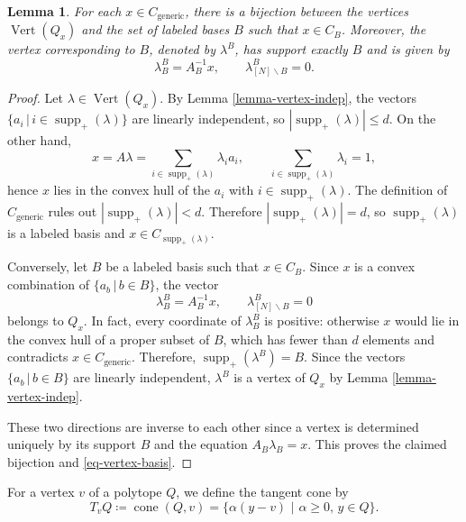 \documentclass[12pt]{amsart}
\newtheorem{lemma}[theorem]{Lemma}
\numberwithin{equation}{section}
\numberwithin{theorem}{section}
\newcommand{\op}{\operatorname}
\begin{document}
\begin{lemma}
  \label{lemma-vertex-basis}
  For each $x\in C_{\mathrm{generic}}$, there is a bijection between the vertices $\op{Vert}(Q_x)$ and the set of labeled bases $B$ such that $x\in C_B$. Moreover, the vertex corresponding to $B$, denoted by $\lambda^B$, has support exactly $B$ and is given by
  \begin{equation}
  \label{eq-vertex-basis}
    \lambda^B_B=A^{-1}_Bx,\qquad \lambda^B_{[N]\backslash B}=0.
  \end{equation}
\end{lemma}
\begin{proof}
  Let $\lambda\in\op{Vert}(Q_x)$. By Lemma \ref{lemma-vertex-indep}, the vectors $\{a_i\,|\,i\in \op{supp}_+(\lambda)\}$ are linearly independent, so $|\op{supp}_+(\lambda)|\leq d$. On the other hand,
  \begin{equation*}
    x=A\lambda=\sum_{i\in \op{supp}_+(\lambda)}\lambda_i a_i,
    \qquad \sum_{i\in \op{supp}_+(\lambda)}\lambda_i=1,
  \end{equation*}
  hence $x$ lies in the convex hull of the $a_i$ with $i\in\op{supp}_+(\lambda)$. The definition of $C_{\mathrm{generic}}$ rules out $|\op{supp}_+(\lambda)|<d$. Therefore $|\op{supp}_+(\lambda)|=d$, so $\op{supp}_+(\lambda)$ is a labeled
  basis and $x\in C_{\op{supp}_+(\lambda)}$.

  Conversely, let $B$ be a labeled basis such that $x\in C_B$. Since $x$ is a convex combination of $\{a_b\,|\,b\in B\}$, the vector
  \begin{equation*}
    \lambda^B_B=A_B^{-1}x,\qquad
    \lambda^B_{[N]\backslash B}=0
  \end{equation*}
  belongs to $Q_x$. In fact, every coordinate of $\lambda^B_B$ is positive: otherwise $x$ would lie in the convex hull of a proper subset of $B$, which has fewer than $d$ elements and contradicts $x\in C_{\mathrm{generic}}$.
  Therefore, $\op{supp}_+(\lambda^B)=B$.
  Since the vectors $\{a_b\,|\,b\in B\}$ are linearly independent, $\lambda^B$ is a vertex of $Q_x$ by Lemma \ref{lemma-vertex-indep}.

  These two directions are inverse to each other since a vertex is determined uniquely by its support $B$ and the equation $A_B\lambda_B=x$. This proves the claimed bijection and \eqref{eq-vertex-basis}.
\end{proof}

For a vertex $v$ of a polytope $Q$, we define the tangent cone by
\begin{equation}
  T_v Q\coloneqq \op{cone}(Q,v)=\{\alpha(y-v)\,\,|\,\, \alpha\geq0,\, y\in Q\}.
\end{equation}
\end{document}
